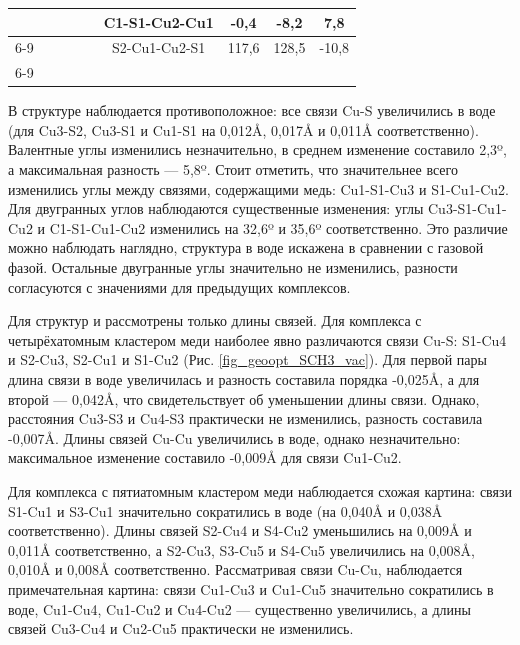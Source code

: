\documentclass[a4paper,12pt]{article}
\begin{document}
\begin{onehalfspace}
\begin{table}[H]
\begin{tabular}{ccccc|cccc|}
			&                             &                            &                               &           & \multicolumn{1}{c|}{C1-S1-Cu2-Cu1} & \multicolumn{1}{c|}{-0,4}   & \multicolumn{1}{c|}{-8,2}  & 7,8      \\ \cline{6-9} 
			&                             &                            &                               &           & \multicolumn{1}{c|}{S2-Cu1-Cu2-S1} & \multicolumn{1}{c|}{117,6}  & \multicolumn{1}{c|}{128,5} & -10,8    \\ \cline{6-9} 
		\end{tabular}
	\end{table}
	
	В структуре  наблюдается противоположное: все связи Cu-S увеличились в воде (для Cu3-S2, Cu3-S1 и Cu1-S1 на 0,012Å, 0,017Å и 0,011Å соответственно). Валентные углы изменились незначительно, в среднем изменение составило 2,3º, а максимальная разность — 5,8º. Стоит отметить, что значительнее всего изменились углы между связями, содержащими медь: Cu1-S1-Cu3 и S1-Cu1-Cu2. Для двугранных углов наблюдаются существенные изменения: углы Cu3-S1-Cu1-Cu2 и C1-S1-Cu1-Cu2 изменились на 32,6º и 35,6º соответственно. Это различие можно наблюдать наглядно, структура в воде искажена в сравнении с газовой фазой. Остальные двугранные углы значительно не изменились, разности согласуются с значениями для предыдущих комплексов.
	
	Для структур  и  рассмотрены только длины связей. Для комплекса с четырёхатомным кластером меди наиболее явно различаются связи Cu-S: S1-Cu4 и S2-Cu3, S2-Cu1 и S1-Cu2 (Рис. \ref{fig_geoopt_SCH3_vac}). Для первой пары длина связи в воде увеличилась и разность составила порядка -0,025Å, а для второй — 0,042Å, что свидетельствует об уменьшении длины связи. Однако, расстояния Cu3-S3 и Cu4-S3 практически не изменились, разность составила -0,007Å. Длины связей Cu-Cu увеличились в воде, однако незначительно: максимальное изменение составило -0,009Å для связи Cu1-Cu2.
	
	Для комплекса с пятиатомным кластером меди наблюдается схожая картина: связи S1-Cu1 и S3-Cu1 значительно сократились в воде (на 0,040Å и 0,038Å соответственно). Длины связей S2-Cu4 и S4-Cu2 уменьшились на 0,009Å и 0,011Å соответственно, а S2-Cu3, S3-Cu5 и S4-Cu5 увеличились на 0,008Å, 0,010Å и 0,008Å соответственно. Рассматривая связи Cu-Cu, наблюдается примечательная картина: связи Cu1-Cu3 и Cu1-Cu5 значительно сократились в воде, Cu1-Cu4, Cu1-Cu2 и Cu4-Cu2 — существенно увеличились, а длины связей Cu3-Cu4 и Cu2-Cu5 практически не изменились.
	

\end{onehalfspace}
\end{document}
